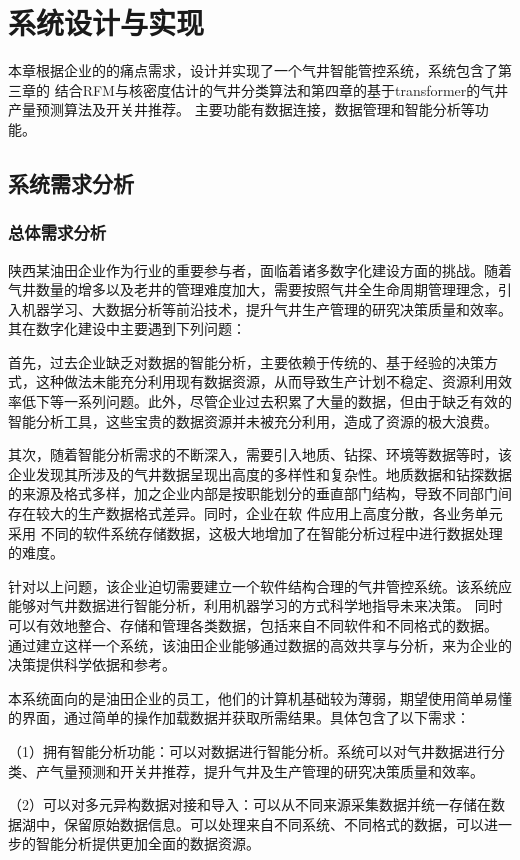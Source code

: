 \chapter{系统设计与实现}
本章根据企业的的痛点需求，设计并实现了一个气井智能管控系统，系统包含了第三章的
结合RFM与核密度估计的气井分类算法和第四章的基于transformer的气井产量预测算法及开关井推荐。
主要功能有数据连接，数据管理和智能分析等功能。
\section{系统需求分析}
\subsection{总体需求分析}
陕西某油田企业作为行业的重要参与者，面临着诸多数字化建设方面的挑战。随着气井数量的增多以及老井的管理难度加大，需要按照气井全生命周期管理理念，引入机器学习、大数据分析等前沿技术，提升气井生产管理的研究决策质量和效率。其在数字化建设中主要遇到下列问题：

首先，过去企业缺乏对数据的智能分析，主要依赖于传统的、基于经验的决策方式，这种做法未能充分利用现有数据资源，从而导致生产计划不稳定、资源利用效率低下等一系列问题。此外，尽管企业过去积累了大量的数据，但由于缺乏有效的智能分析工具，这些宝贵的数据资源并未被充分利用，造成了资源的极大浪费。

其次，随着智能分析需求的不断深入，需要引入地质、钻探、环境等数据等时，该企业发现其所涉及的气井数据呈现出高度的多样性和复杂性。地质数据和钻探数据的来源及格式多样，加之企业内部是按职能划分的垂直部门结构，导致不同部门间存在较大的生产数据格式差异。同时，企业在软
件应用上高度分散，各业务单元采用
不同的软件系统存储数据，这极大地增加了在智能分析过程中进行数据处理的难度。

针对以上问题，该企业迫切需要建立一个软件结构合理的气井管控系统。该系统应能够对气井数据进行智能分析，利用机器学习的方式科学地指导未来决策。
同时可以有效地整合、存储和管理各类数据，包括来自不同软件和不同格式的数据。
通过建立这样一个系统，该油田企业能够通过数据的高效共享与分析，来为企业的决策提供科学依据和参考。

本系统面向的是油田企业的员工，他们的计算机基础较为薄弱，期望使用简单易懂的界面，通过简单的操作加载数据并获取所需结果。具体包含了以下需求：

（1）拥有智能分析功能：可以对数据进行智能分析。系统可以对气井数据进行分类、产气量预测和开关井推荐，提升气井及生产管理的研究决策质量和效率。

（2）可以对多元异构数据对接和导入：可以从不同来源采集数据并统一存储在数据湖中，保留原始数据信息。可以处理来自不同系统、不同格式的数据，可以进一步的智能分析提供更加全面的数据资源。

